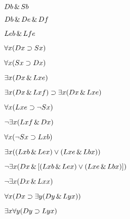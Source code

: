 \begin{earg}
\item %
$Db \,\&\, Sb$
\item %
$Db \,\&\, De \,\&\, Df$
\item %
$Leb \,\&\, Lfe$
\item %
$\forall x(Dx \supset Sx)$
\item %
$\forall x(Sx \supset Dx)$
\item %
$\exists x(Dx \,\&\, Lxe)$
\item %
$\exists x(Dx \,\&\, Lxf) \supset \exists x(Dx \,\&\, Lxe)$
\item %
$\forall x(Lxe \supset \neg Sx)$
\item %
$\neg \exists x(Lxf \,\&\, Dx)$
\item %
$\forall x(\neg Sx \supset Lxb)$
\item %
$\exists x((Lxb \,\&\, Lex) \vee (Lxe \,\&\, Lbx))$
\item %
$\neg \exists x(Dx \,\&\, [(Lxb \,\&\, Lex) \vee (Lxe \,\&\, Lbx)])$
\item %
$\neg \exists x(Dx \,\&\, Lxx)$
\item %
$\forall x(Dx \supset \exists y(Dy \,\&\, Lyx))$
\item %
$\exists x \forall y(Dy \supset Lyx)$
\end{earg}




